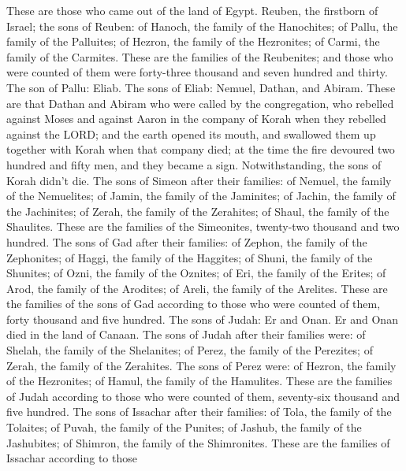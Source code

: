 These are those who came out of the land of Egypt. 
Reuben, the firstborn of Israel; the sons of Reuben: of Hanoch, the
family of the Hanochites; of Pallu, the family of the Palluites;
 of Hezron, the family of the Hezronites; of Carmi, the
family of the Carmites.  These are the families of the
Reubenites; and those who were counted of them were forty-three thousand
and seven hundred and thirty.  The son of Pallu: Eliab.
 The sons of Eliab: Nemuel, Dathan, and Abiram. These are
that Dathan and Abiram who were called by the congregation, who rebelled
against Moses and against Aaron in the company of Korah when they
rebelled against the LORD;  and the earth opened its
mouth, and swallowed them up together with Korah when that company died;
at the time the fire devoured two hundred and fifty men, and they became
a sign.  Notwithstanding, the sons of Korah didn't die.
 The sons of Simeon after their families: of Nemuel, the
family of the Nemuelites; of Jamin, the family of the Jaminites; of
Jachin, the family of the Jachinites;  of Zerah, the
family of the Zerahites; of Shaul, the family of the Shaulites.
 These are the families of the Simeonites, twenty-two
thousand and two hundred.  The sons of Gad after their
families: of Zephon, the family of the Zephonites; of Haggi, the family
of the Haggites; of Shuni, the family of the Shunites; 
of Ozni, the family of the Oznites; of Eri, the family of the Erites;
 of Arod, the family of the Arodites; of Areli, the
family of the Arelites.  These are the families of the
sons of Gad according to those who were counted of them, forty thousand
and five hundred.  The sons of Judah: Er and Onan. Er and
Onan died in the land of Canaan.  The sons of Judah after
their families were: of Shelah, the family of the Shelanites; of Perez,
the family of the Perezites; of Zerah, the family of the Zerahites.
 The sons of Perez were: of Hezron, the family of the
Hezronites; of Hamul, the family of the Hamulites.  These
are the families of Judah according to those who were counted of them,
seventy-six thousand and five hundred.  The sons of
Issachar after their families: of Tola, the family of the Tolaites; of
Puvah, the family of the Punites;  of Jashub, the family
of the Jashubites; of Shimron, the family of the Shimronites.
 These are the families of Issachar according to those
